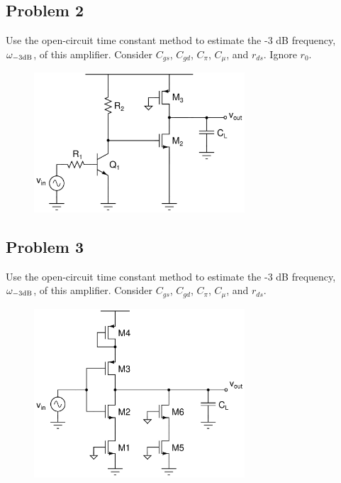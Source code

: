 \documentclass{article}
\begin{document}
\subsection*{Problem 2}
Use the open-circuit time constant method to estimate the -3 dB frequency, $\omega_{\rm -3 dB}$, of this amplifier.  Consider $C_{gs}$, $C_{gd}$, $C_{\pi}$, $C_{\mu}$, and $r_{ds}$.  Ignore $r_0$. \\ 
\begin{figure}[!h]
\begin{center}
    \includegraphics[width=0.7\textwidth]{figures/cc_octc1.jpg}
\end{center}
\end{figure}
\newpage
\subsection*{Problem 3}
Use the open-circuit time constant method to estimate the -3 dB frequency, $\omega_{\rm -3 dB}$, of this amplifier.  Consider $C_{gs}$, $C_{gd}$, $C_{\pi}$, $C_{\mu}$, and $r_{ds}$. 
\begin{figure}[!h]
\begin{center}
    \includegraphics[width=0.7\textwidth]{figures/cc_octc3 (2).jpg}

\end{center}
\end{figure}
\newpage
\end{document}
